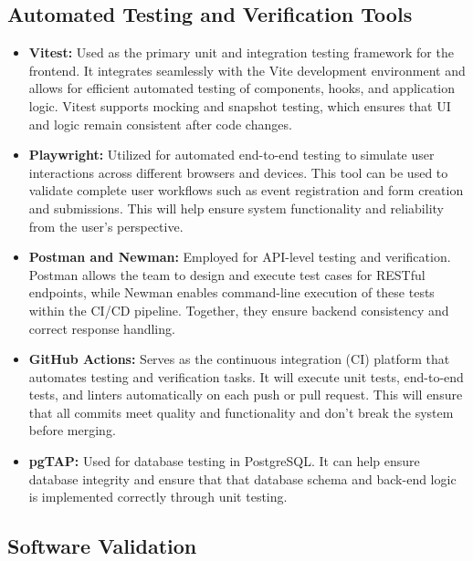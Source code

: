 \documentclass[12pt, titlepage]{article}
\begin{document}
\subsection{Automated Testing and Verification Tools}

\begin{itemize}
    \item \textbf{Vitest:} Used as the primary unit and integration testing framework for the frontend. It integrates seamlessly with the Vite development environment and allows for efficient automated testing of components, hooks, and application logic. Vitest supports mocking and snapshot testing, which ensures that UI and logic remain consistent after code changes.

    \item \textbf{Playwright:} Utilized for automated end-to-end testing to simulate user interactions across different browsers and devices. This tool can be used to validate complete user workflows such as event registration and form creation and submissions. This will help ensure system functionality and reliability from the user's perspective.

    \item \textbf{Postman and Newman:} Employed for API-level testing and verification. Postman allows the team to design and execute test cases for RESTful endpoints, while Newman enables command-line execution of these tests within the CI/CD pipeline. Together, they ensure backend consistency and correct response handling.

    \item \textbf{GitHub Actions:} Serves as the continuous integration (CI) platform that automates testing and verification tasks. It will execute unit tests, end-to-end tests, and linters automatically on each push or pull request. This will ensure that all commits meet quality and functionality and don't break the system before merging.

    \item \textbf{pgTAP:} Used for database testing in PostgreSQL. It can help ensure database integrity and ensure that that database schema and back-end logic is implemented correctly through unit testing.
\end{itemize}

\subsection{Software Validation}
\end{document}
